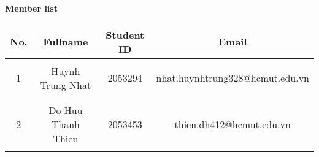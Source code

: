 \clearpage
\vspace{2cm}
\textbf{Member list}
\begin{center}
\begin{tabular}{|c|c|c|c|}
\hline
\textbf{No.} & \textbf{Fullname} & \textbf{Student ID} & \textbf{Email}\\
\hline 
 & &  &  \\
{1} & {Huynh Trung Nhat} & {2053294} &{nhat.huynhtrung328@hcmut.edu.vn}\\
 & &  &  \\
\hline 
 & &  &  \\
{2} & {Do Huu Thanh Thien} & {2053453} &{thien.dh412@hcmut.edu.vn}\\
 & &  &  \\
\hline 

\end{tabular}
\end{center}